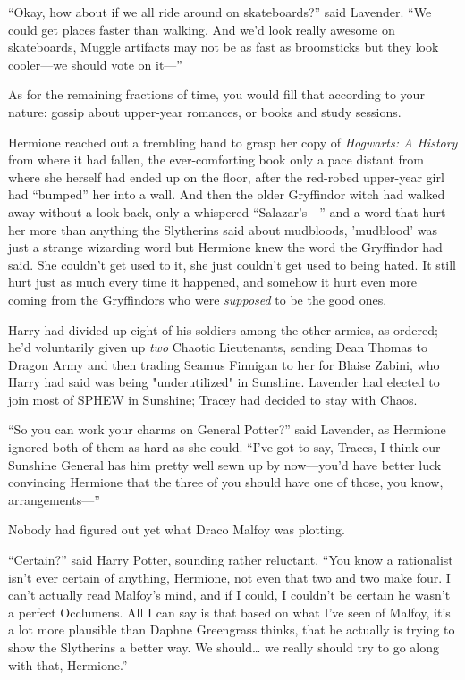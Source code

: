\begin{em}
``Okay, how about if we all ride around on skateboards?'' said Lavender. 
``We could get places faster than walking. And we'd look really awesome on 
skateboards, Muggle artifacts may not be as fast as broomsticks but they look 
cooler---we should vote on it---''
\end{em}

As for the remaining fractions of time, you would fill that according to your 
nature: gossip about upper-year romances, or books and study sessions.

\begin{em}
Hermione reached out a trembling hand to grasp her copy of \emph{Hogwarts: A 
History} from where it had fallen, the ever-comforting book only a pace 
distant from where she herself had ended up on the floor, after the red-robed 
upper-year girl had ``bumped'' her into a wall. And then the older Gryffindor 
witch had walked away without a look back, only a whispered ``Salazar's---'' and 
a word that hurt her more than anything the Slytherins said about mudbloods, 
'mudblood' was just a strange wizarding word but Hermione knew the word the 
Gryffindor had said. She couldn't get used to it, she just couldn't get used to 
being hated. It still hurt just as much every time it happened, and somehow it 
hurt even more coming from the Gryffindors who were \emph{supposed} to be the 
good ones.
\end{em}

Harry had divided up eight of his soldiers among the other armies, as ordered; 
he'd voluntarily given up \emph{two} Chaotic Lieutenants, sending Dean Thomas 
to Dragon Army and then trading Seamus Finnigan to her for Blaise Zabini, who 
Harry had said was being "underutilized" in Sunshine. Lavender had elected to 
join most of SPHEW in Sunshine; Tracey had decided to stay with Chaos.

\begin{em}
``So you can work your charms on General Potter?'' said Lavender, as 
Hermione ignored both of them as hard as she could. ``I've got to say, Traces, I 
think our Sunshine General has him pretty well sewn up by now---you'd have 
better luck convincing Hermione that the three of you should have one of those, 
you know, arrangements---''
\end{em}

Nobody had figured out yet what Draco Malfoy was plotting.

\begin{em}
``Certain?'' said Harry Potter, sounding rather reluctant. ``You know a 
rationalist isn't ever certain of anything, Hermione, not even that two and two 
make four. I can't actually read Malfoy's mind, and if I could, I couldn't be 
certain he wasn't a perfect Occlumens. All I can say is that based on what I've 
seen of Malfoy, it's a lot more plausible than Daphne Greengrass thinks, that 
he actually is trying to show the Slytherins a better way. We should{\ldots} we 
really should try to go along with that, Hermione.''
\end{em}

